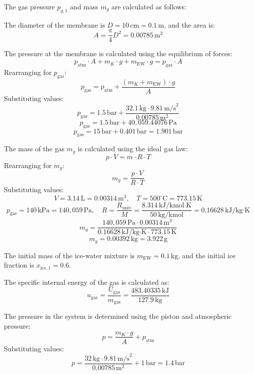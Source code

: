 The gas pressure \( p_{g,1} \) and mass \( m_g \) are calculated as follows:  

The diameter of the membrane is \( D = 10 \, \text{cm} = 0.1 \, \text{m} \), and the area is:  
\[
A = \frac{\pi}{4} D^2 = 0.00785 \, \text{m}^2
\]  

The pressure at the membrane is calculated using the equilibrium of forces:  
\[
p_{\text{atm}} \cdot A + m_K \cdot g + m_{\text{EW}} \cdot g = p_{\text{gas}} \cdot A
\]  
Rearranging for \( p_{\text{gas}} \):  
\[
p_{\text{gas}} = p_{\text{atm}} + \frac{(m_K + m_{\text{EW}}) \cdot g}{A}
\]  
Substituting values:  
\[
p_{\text{gas}} = 1.5 \, \text{bar} + \frac{32.1 \, \text{kg} \cdot 9.81 \, \text{m/s}^2}{0.00785 \, \text{m}^2}
\]  
\[
p_{\text{gas}} = 1.5 \, \text{bar} + 40,059.44076 \, \text{Pa}
\]  
\[
p_{\text{gas}} = 15 \, \text{bar} + 0.401 \, \text{bar} = 1.901 \, \text{bar}
\]  

The mass of the gas \( m_g \) is calculated using the ideal gas law:  
\[
p \cdot V = m \cdot R \cdot T
\]  
Rearranging for \( m_g \):  
\[
m_g = \frac{p \cdot V}{R \cdot T}
\]  
Substituting values:  
\[
V = 3.14 \, \text{L} = 0.00314 \, \text{m}^3, \quad T = 500^\circ\text{C} = 773.15 \, \text{K}
\]  
\[
p_{\text{gas}} = 140 \, \text{kPa} = 140,059 \, \text{Pa}, \quad R = \frac{R_{\text{univ}}}{M} = \frac{8.314 \, \text{kJ/kmol·K}}{50 \, \text{kg/kmol}} = 0.16628 \, \text{kJ/kg·K}
\]  
\[
m_g = \frac{140,059 \, \text{Pa} \cdot 0.00314 \, \text{m}^3}{0.16628 \, \text{kJ/kg·K} \cdot 773.15 \, \text{K}}
\]  
\[
m_g = 0.00392 \, \text{kg} = 3.922 \, \text{g}
\]

The initial mass of the ice-water mixture is \( m_{\text{EW}} = 0.1 \, \text{kg} \), and the initial ice fraction is \( x_{\text{ice},1} = 0.6 \).  

The specific internal energy of the gas is calculated as:  
\[
u_{\text{gas}} = \frac{U_{\text{gas}}}{m_{\text{gas}}} = \frac{483.40335 \, \text{kJ}}{127.9 \, \text{kg}}
\]  

The pressure in the system is determined using the piston and atmospheric pressure:  
\[
p = \frac{m_K \cdot g}{A} + p_{\text{atm}}
\]  
Substituting values:  
\[
p = \frac{32 \, \text{kg} \cdot 9.81 \, \text{m/s}^2}{0.00785 \, \text{m}^2} + 1 \, \text{bar} = 1.4 \, \text{bar}
\]